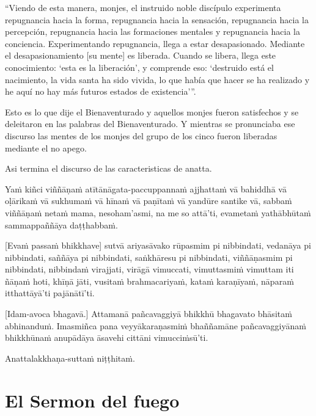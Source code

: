 “Viendo de esta manera, monjes, el instruido noble discípulo experimenta repugnancia hacia la forma, repugnancia hacia la sensación, repugnancia hacia la percepción, repugnancia hacia las formaciones mentales y repugnancia hacia la conciencia. Experimentando repugnancia, llega a estar desapasionado. Mediante el desapasionamiento [su mente] es liberada. Cuando se libera, llega este conocimiento: ‘esta es la liberación’, y comprende eso: ‘destruido está el nacimiento, la vida santa ha sido vivida, lo que había que hacer se ha realizado y he aquí no hay más futuros estados de existencia’”.

Esto es lo que dije el Bienaventurado y aquellos monjes fueron satisfechos y se deleitaron en las palabras del Bienaventurado. Y mientras se pronunciaba ese discurso las mentes de los monjes del grupo de los cinco fueron liberadas mediante el no apego.

Asi termina el discurso de las caracteristicas de anatta.

\clearpage

\paliText
\markboth{\paliTitle}{\rightmark}

Yaṁ kiñci viññāṇaṁ atītānāgata-paccuppannaṁ ajjhattaṁ vā bahiddhā vā
oḷārikaṁ vā sukhumaṁ vā hīnaṁ vā paṇītaṁ vā yandūre santike vā, sabbaṁ
viññāṇaṁ netaṁ mama, nesoham'asmi, na me so attā'ti, evametaṁ yathābhūtaṁ
sammappaññāya daṭṭhabbaṁ.

[Evaṁ passaṁ bhikkhave] sutvā ariyasāvako rūpasmim pi nibbindati, vedanāya
pi nibbindati, saññāya pi nibbindati, saṅkhāresu pi nibbindati,
viññāṇasmim pi nibbindati, nibbindaṁ virajjati, virāgā vimuccati,
vimuttasmiṁ vimuttam iti ñāṇaṁ hoti, khīṇā jāti, vusitaṁ brahmacariyaṁ,
kataṁ karaṇīyaṁ, nāparaṁ itthattāyā'ti pajānātī'ti.

[Idam-avoca bhagavā.] Attamanā pañcavaggiyā bhikkhū bhagavato bhāsitaṁ
abhinanduṁ. Imasmiñca pana veyyākaraṇasmiṁ bhaññamāne pañcavaggiyānaṁ
bhikkhūnaṁ anupādāya āsavehi cittāni vimucciṁsū'ti.

Anattalakkhaṇa-suttaṁ niṭṭhitaṁ.

\chapterTocDelegatePageNumber
\chapter{El Sermon del fuego}

\setTocDelegatedPageNumber
\englishText
\renewcommand{\englishTitle}{El Sermon del fuego}

